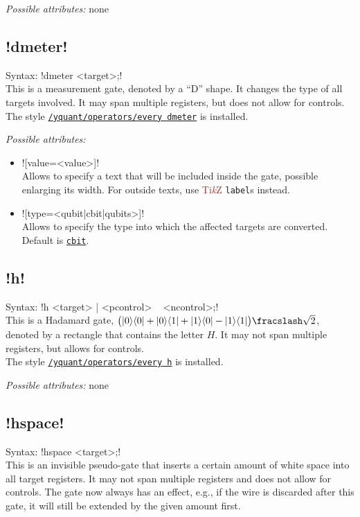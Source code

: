 \documentclass{scrartcl}
\def\TikZ{\textcolor{brown}{Ti\textit kZ}}
\def\gate#1{\hyperref[gate:#1]{\texttt{#1}}}
\def\style#1{\hyperref[style:#1]{\texttt{#1}}}
\def\ketbra#1#2{\ket{#1}\!\bra{#2}}
\begin{document}
         \emph{Possible attributes:} none

      \subsection{\texorpdfstring{\yquant!dmeter!}{dmeter}}\label{gate:dmeter}
         Syntax: \yquant!dmeter <target>;! \\
         This is a measurement gate, denoted by a ``D'' shape.
         It changes the type of all targets involved.
         It may span multiple registers, but does not allow for controls.
         The style \style{/yquant/operators/every dmeter} is installed.

         \emph{Possible attributes:}
         \begin{itemize}
            \item \yquant![value=<value>]! \\
               Allows to specify a text that will be included inside the gate, possible enlarging its width.
               For outside texts, use \TikZ{} \texttt{label}s instead.
            \item \yquant![type=<qubit|cbit|qubits>]! \\
               Allows to specify the type into which the affected targets are converted.
               Default is \gate{cbit}.
         \end{itemize}

      \subsection{\texorpdfstring{\yquant!h!}{h}}\label{gate:h}
         Syntax: \yquant!h <target> | <pcontrol> ~ <ncontrol>;! \\
         This is a Hadamard gate, $\bigl( \ketbra00 + \ketbra01 + \ketbra10 - \ketbra11 \bigr) \fracslash \sqrt2$, denoted by a rectangle that contains the letter $H$.
         It may not span multiple registers, but allows for controls. \\
         The style \style{/yquant/operators/every h} is installed.

         \emph{Possible attributes:} none

      \subsection{\texorpdfstring{\yquant!hspace!}{hspace}}\label{gate:hspace}
         Syntax: \yquant!hspace <target>;! \\
         This is an invisible pseudo\hyp gate that inserts a certain amount of white space into all target registers.
         It may not span multiple registers and does not allow for controls.
         The gate now always has an effect, e.g., if the wire is discarded after this gate, it will still be extended by the given amount first.
\end{document}
